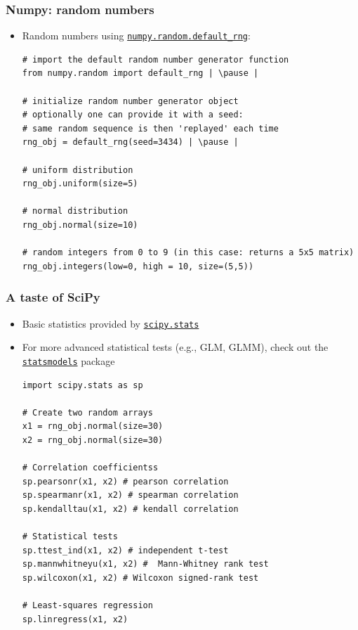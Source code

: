 \documentclass[xcolor=table]{beamer}
\begin{document}
\begin{frame}[fragile]
\frametitle{Numpy: random numbers}
    \begin{itemize}
        \item Random numbers using \href{https://docs.scipy.org/doc/numpy/reference/random/generator.html#numpy.random.default_rng}{\texttt{numpy.random.default\_rng}}:
\begin{lstlisting}[style=python]
# import the default random number generator function
from numpy.random import default_rng | \pause |

# initialize random number generator object
# optionally one can provide it with a seed:
# same random sequence is then 'replayed' each time
rng_obj = default_rng(seed=3434) | \pause |

# uniform distribution
rng_obj.uniform(size=5)

# normal distribution
rng_obj.normal(size=10)

# random integers from 0 to 9 (in this case: returns a 5x5 matrix) 
rng_obj.integers(low=0, high = 10, size=(5,5))
\end{lstlisting}
    \end{itemize}
\end{frame}

\begin{frame}[fragile]
\frametitle{A taste of SciPy}
    \begin{itemize}
        \item Basic statistics provided by \href{https://docs.scipy.org/doc/scipy/reference/stats.html}{\texttt{scipy.stats}}
        \item For more advanced statistical tests (e.g., GLM, GLMM), check out the \href{https://www.statsmodels.org/stable/index.html}{\texttt{statsmodels}} package
\begin{lstlisting}[style=python]
import scipy.stats as sp

# Create two random arrays
x1 = rng_obj.normal(size=30)
x2 = rng_obj.normal(size=30)

# Correlation coefficientss
sp.pearsonr(x1, x2) # pearson correlation
sp.spearmanr(x1, x2) # spearman correlation
sp.kendalltau(x1, x2) # kendall correlation

# Statistical tests
sp.ttest_ind(x1, x2) # independent t-test
sp.mannwhitneyu(x1, x2) #  Mann-Whitney rank test 
sp.wilcoxon(x1, x2) # Wilcoxon signed-rank test

# Least-squares regression
sp.linregress(x1, x2)
\end{lstlisting}
    \end{itemize}
\end{frame}
\end{document}
